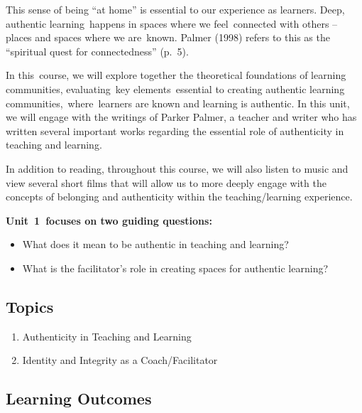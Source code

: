\documentclass[
]{book}
\providecommand{\tightlist}{%
  \setlength{\itemsep}{0pt}\setlength{\parskip}{0pt}}
\begin{document}
This sense of being ``at home'' is essential to our experience as learners. Deep, authentic learning~happens in spaces where we feel~connected with others -- places and spaces where we are~known. Palmer (1998) refers to this as the ``spiritual quest for connectedness'' (p.~5).

In this~course, we will explore together the theoretical foundations of learning communities, evaluating~key elements~essential to creating authentic learning communities,~where~learners are known and learning is authentic. In this unit, we will engage with the writings of Parker Palmer, a teacher and writer who has written several important works regarding the essential role of authenticity in teaching and learning.

In addition to reading, throughout this course, we will also listen to music and view several short films that will allow us to more deeply engage with the concepts of belonging and authenticity within the teaching/learning experience.

\textbf{Unit~1~focuses on two guiding questions:}

\begin{itemize}
\tightlist
\item
  What does it mean to be authentic in teaching and learning?\\
\item
  What is the facilitator's role in creating spaces for authentic learning?
\end{itemize}

\hypertarget{topics}{%
\subsection*{Topics}\label{topics}}

\begin{enumerate}
\def\labelenumi{\arabic{enumi}.}
\tightlist
\item
  Authenticity in Teaching and Learning\\
\item
  Identity and Integrity as a Coach/Facilitator
\end{enumerate}

\hypertarget{learning-outcomes}{%
\subsection*{Learning Outcomes}\label{learning-outcomes}}
\end{document}
